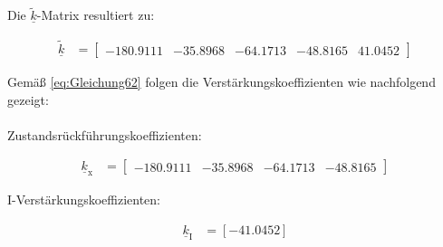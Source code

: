Die $\underline{\tilde{k}}$-Matrix resultiert zu:

\begin{align}\label{eq:Gleichung68}
    \underline{\tilde{k}} &= 
    \begin{bmatrix}
        -180.9111 & -35.8968 & -64.1713 & -48.8165 & 41.0452
    \end{bmatrix}
\end{align}

Gemäß \autoref{eq:Gleichung62} folgen die Verstärkungskoeffizienten wie nachfolgend gezeigt:\\\\
Zustandsrückführungskoeffizienten:

\begin{align}\label{eq:Gleichung69}
    \underline{k}_{\mathrm{x}} &= 
    \begin{bmatrix}
        -180.9111 & -35.8968 & -64.1713 & -48.8165
    \end{bmatrix}
\end{align}

I-Verstärkungskoeffizienten:

\begin{align}\label{eq:Gleichugn70}
    \underline{k}_{\mathrm{I}} &= [-41.0452]
\end{align}